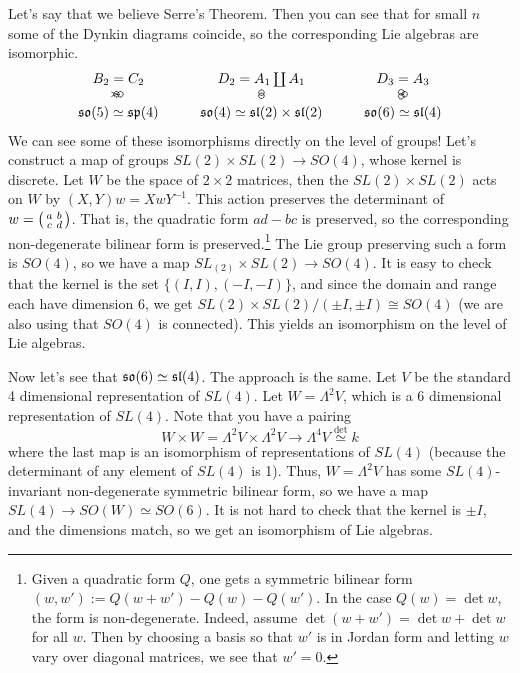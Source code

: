   Let's say that we believe Serre's
 Theorem. Then you can see that for small $n$ some of the Dynkin diagrams coincide, so
 the corresponding Lie algebras are isomorphic.
 \[\begin{array}{ccc}
 B_2 = C_2 & D_2 = A_1\coprod A_1 & D_3=A_3 \\
 \begin{xy}
   (0,0) *{},
   (0,.5) *\cir<2pt>{};
   (1,.5) *\cir<2pt>{} **@{=} ?*@{>},
 \end{xy} & \begin{xy}
   (0,.1) *\cir<2pt>{},
   (0,.9) *\cir<2pt>{},
 \end{xy} &
 \begin{xy}
   (0,0) *\cir<2pt>{};
   a(30) *\cir<2pt>{} **@{-};
   (0,1) *\cir<2pt>{} **@{-},
 \end{xy}\\
 \quad \so(5)\simeq \sp(4) \quad & \quad \so(4)\simeq \sl(2)\times \sl(2)
 \quad & \quad \so(6)\simeq \sl(4) \quad
 \end{array}\]
 We can see some of these isomorphisms directly on the level of groups! Let's
 construct a map of groups $SL(2)\times SL(2) \to SO(4)$, whose kernel is discrete.
 Let $W$ be the space of $2\times 2$ matrices, then the $SL(2)\times SL(2)$ acts on
 $W$ by $(X,Y)w = XwY^{-1}$. This action preserves the determinant of $w=\left( \begin{smallmatrix} a & b \\ c & d \end{smallmatrix} \right)$. That is, the quadratic form $ad-bc$ is preserved, so the corresponding
 non-degenerate bilinear form is preserved.\footnote{Given a quadratic form $Q$, one
 gets a symmetric bilinear form $(w,w'):=Q(w+w')-Q(w)-Q(w')$. In the case $Q(w)=\det
 w$, the form is non-degenerate. Indeed, assume $\det(w+w')=\det w + \det w$ for all
 $w$. Then by choosing a basis so that $w'$ is in Jordan form and letting $w$ vary
 over diagonal matrices, we see that $w'=0$.} The Lie group preserving such a form is
 $SO(4)$, so we have a map $SL_(2)\times SL(2)\to SO(4)$. It is easy to check that the
 kernel is the set $\{(I,I),(-I,-I)\}$, and since the domain and range each have
 dimension 6, we get $SL(2)\times SL(2)/(\pm I,\pm I)\cong SO(4)$ (we are also using
 that $SO(4)$ is connected). This yields an isomorphism on the level of Lie algebras.

 Now let's see that $\mathfrak{so}(6)\simeq \mathfrak{sl}(4)$. The approach is the same. Let $V$ be the
 standard 4 dimensional representation of $SL(4)$. Let $W = \Lambda^2 V$, which is a
 6 dimensional representation of $SL(4)$. Note that you have a pairing
 \[
    W\times W = \Lambda^2 V \times \Lambda^2 V \to \Lambda^4 V \overset{\det}{\simeq} k
 \]
 where the last map is an isomorphism of representations of $SL(4)$ (because the
 determinant of any element of $SL(4)$ is 1). Thus, $W=\Lambda^2 V$ has some
 $SL(4)$-invariant non-degenerate symmetric bilinear form, so we have a map $SL(4)\to
 SO(W)\simeq SO(6)$. It is not hard to check that the kernel is $\pm I$, and the
 dimensions match, so we get an isomorphism of Lie algebras.
